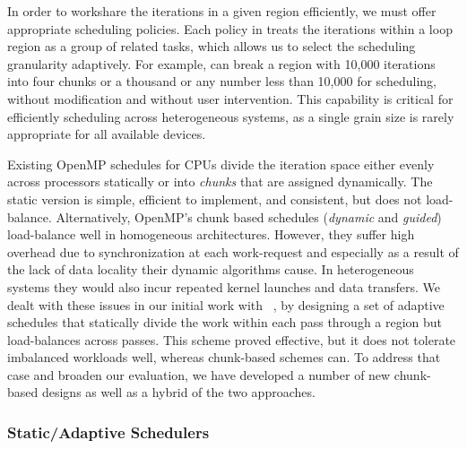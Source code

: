 In order to workshare the iterations in a given region efficiently, we
must offer appropriate scheduling policies. Each policy in \tsar
treats the iterations within a loop region as a group of related
tasks, which allows us to select the scheduling granularity
adaptively. For example, \tsar can break a region with 10,000
iterations into four chunks or a thousand or any number less than
10,000 for scheduling, without modification and without user
intervention.  This capability is critical for efficiently scheduling
across heterogeneous systems, as a single grain size is rarely
appropriate for all available devices.

Existing OpenMP schedules for CPUs divide the iteration space either evenly
across processors statically or into \emph{chunks} that are assigned
dynamically. The static version is simple, efficient to implement, and
consistent, but does not load-balance.  Alternatively, OpenMP's chunk based
schedules (\emph{dynamic} and \emph{guided}) load-balance well in homogeneous
architectures. However, they suffer high overhead due to synchronization at
each work-request and especially as a result of the lack of data locality
their dynamic algorithms cause. In heterogeneous systems they would also incur
repeated kernel launches and data transfers.  We dealt with these issues in our
initial work with \tsar~\cite{scogland:7Hpt64iV}, by designing a set of
adaptive schedules that statically divide the work within each pass through a
region but load-balances across passes.  This scheme proved effective, but it
does not tolerate imbalanced workloads well, whereas chunk-based schemes can.
To address that case and broaden our evaluation, we have developed a number
of new chunk-based designs as well as a hybrid of the two approaches.




\subsubsection{Static/Adaptive Schedulers}


